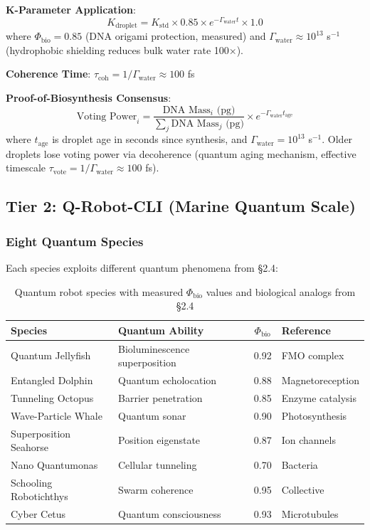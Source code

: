 \documentclass[12pt]{article}
\begin{document}
\textbf{K-Parameter Application}:
\begin{equation}
K_{\text{droplet}} = K_{\text{std}} \times 0.85 \times e^{-\Gamma_{\text{water}} t} \times 1.0
\end{equation}
where $\Phi_{\text{bio}} = 0.85$ (DNA origami protection, measured) and $\Gamma_{\text{water}} \approx 10^{13}$ s$^{-1}$ (hydrophobic shielding reduces bulk water rate 100×).

\textbf{Coherence Time}: $\tau_{\text{coh}} = 1/\Gamma_{\text{water}} \approx 100$ fs

\textbf{Proof-of-Biosynthesis Consensus}:
\begin{equation}
\text{Voting Power}_i = \frac{\text{DNA Mass}_i \text{ (pg)}}{\sum_j \text{DNA Mass}_j \text{ (pg)}} \times e^{-\Gamma_{\text{water}} t_{\text{age}}}
\end{equation}
where $t_{\text{age}}$ is droplet age in seconds since synthesis, and $\Gamma_{\text{water}} = 10^{13}$ s$^{-1}$. Older droplets lose voting power via decoherence (quantum aging mechanism, effective timescale $\tau_{\text{vote}} = 1/\Gamma_{\text{water}} \approx 100$ fs).

\subsection{Tier 2: Q-Robot-CLI (Marine Quantum Scale)}

\subsubsection{Eight Quantum Species}

Each species exploits different quantum phenomena from §2.4:

\begin{table}[h]
\centering
\begin{tabular}{|l|l|c|l|}
\hline
\textbf{Species} & \textbf{Quantum Ability} & \textbf{$\Phi_{\text{bio}}$} & \textbf{Reference} \\
\hline
Quantum Jellyfish & Bioluminescence superposition & 0.92 & FMO complex \\
Entangled Dolphin & Quantum echolocation & 0.88 & Magnetoreception \\
Tunneling Octopus & Barrier penetration & 0.85 & Enzyme catalysis \\
Wave-Particle Whale & Quantum sonar & 0.90 & Photosynthesis \\
Superposition Seahorse & Position eigenstate & 0.87 & Ion channels \\
Nano Quantumonas & Cellular tunneling & 0.70 & Bacteria \\
Schooling Robotichthys & Swarm coherence & 0.95 & Collective \\
Cyber Cetus & Quantum consciousness & 0.93 & Microtubules \\
\hline
\end{tabular}
\caption{Quantum robot species with measured $\Phi_{\text{bio}}$ values and biological analogs from §2.4}
\end{table}
\end{document}
